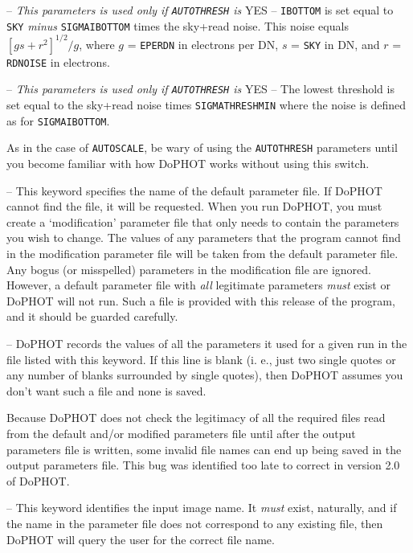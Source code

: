  -- 
{\it This parameters is used
only if {\tt AUTOTHRESH} is} YES -- 
{\tt IBOTTOM} is set equal to 
{\tt SKY} {\it minus} {\tt SIGMAIBOTTOM} times the sky+read
noise.  This  noise equals $[g s + r^2]^{1/2}/g$, where
$g$ = {\tt EPERDN} in electrons per DN, 
$s$ = {\tt SKY} in DN, and $r$ = {\tt RDNOISE} in
electrons.

 -- 
{\it This parameters is used
only if {\tt AUTOTHRESH} is} YES -- 
The lowest threshold is set equal
to the sky+read noise times {\tt SIGMATHRESHMIN} where the noise
is defined as for {\tt SIGMAIBOTTOM}.

\noindent As in the case of {\tt AUTOSCALE}, be wary of using
the {\tt AUTOTHRESH} parameters until you become familiar
with how DoPHOT works without using this switch.

 -- This keyword specifies 
the name of the default parameter file.  If DoPHOT cannot find
the file, it will be requested.  When you run DoPHOT, you must
create a `modification' parameter file that only needs to contain
the parameters you wish to change.  The values of any parameters that the
program cannot find in the modification parameter file will be
taken from the default parameter file.  Any bogus (or misspelled)
parameters in the modification file are ignored.  However, a default
parameter file with 
{\it all} legitimate parameters {\it must} exist or DoPHOT will not
run.  Such a file is provided with this release of the program, and
it should be guarded carefully.

 -- DoPHOT records the values of all
the parameters it used for a given run in the file listed with
this keyword.  If this line is blank (i. e., just two single
quotes or
any number of blanks surrounded by single quotes),
then DoPHOT assumes you
don't want such a file and none is  saved.

Because DoPHOT does not check the legitimacy of all the required
files read from the default and/or modified parameters file until
after the output parameters file is written, some
invalid file names can end up being saved in the output parameters file.
This bug was identified too late to correct in version 2.0 of 
DoPHOT.

 -- This keyword identifies the input
image name.  It {\it must} exist, naturally, and if the name
in the parameter file does not correspond to any existing file, 
then DoPHOT will query the user for the correct file name.

